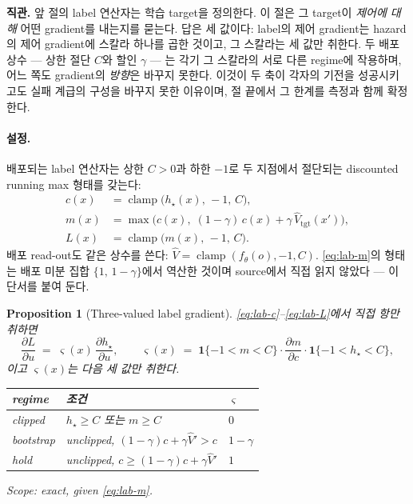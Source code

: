 \documentclass[11pt]{article}
\theoremstyle{plain}
\newtheorem{proposition}[theorem]{Proposition}
\theoremstyle{definition}
\theoremstyle{remark}
\newcommand{\Vhat}{\widehat V}
\begin{document}
\textbf{직관.} 앞 절의 label 연산자는 학습 target을 정의한다. 이 절은 그 target이 \emph{제어에
대해} 어떤 gradient를 내는지를 묻는다. 답은 세 값이다: label의 제어 gradient는 hazard의
제어 gradient에 스칼라 하나를 곱한 것이고, 그 스칼라는 세 값만 취한다. 두 배포 상수 --- 상한
절단 $C$와 할인 $\gamma$ --- 는 각기 그 스칼라의 서로 다른 regime에 작용하며, 어느 쪽도 gradient의
\emph{방향}은 바꾸지 못한다. 이것이 두 축이 각자의 기전을 성공시키고도 실패 계급의 구성을
바꾸지 못한 이유이며, 절 끝에서 그 한계를 측정과 함께 확정한다.

\paragraph{설정.}
배포되는 label 연산자는 상한 $C>0$과 하한 $-1$로 두 지점에서 절단되는 discounted running max
형태를 갖는다:
\begin{align}
  c(x) &= \operatorname{clamp}\!\big(h_\star(x),\, -1,\, C\big), \label{eq:lab-c}\\
  m(x) &= \max\!\Big(c(x),\; (1-\gamma)\,c(x) + \gamma\,\Vhat_{\mathrm{tgt}}(x')\Big),
         \label{eq:lab-m}\\
  L(x) &= \operatorname{clamp}\!\big(m(x),\, -1,\, C\big). \label{eq:lab-L}
\end{align}
배포 read-out도 같은 상수를 쓴다: $\Vhat = \operatorname{clamp}(f_\theta(o),-1,C)$. \eqref{eq:lab-m}의
형태는 배포 미분 집합 $\{1,\,1-\gamma\}$에서 역산한 것이며 source에서 직접 읽지 않았다 --- 이
단서를 붙여 둔다.

\begin{proposition}[Three-valued label gradient]\label{prop:label-tri}
\eqref{eq:lab-c}--\eqref{eq:lab-L}에서 직접 항만 취하면
\begin{equation}
  \frac{\partial L}{\partial u} \;=\; \varsigma(x)\,\frac{\partial h_\star}{\partial u},
  \qquad
  \varsigma(x) \;=\; \mathbf{1}\{-1<m<C\}\cdot\frac{\partial m}{\partial c}\cdot
             \mathbf{1}\{-1<h_\star<C\},
  \label{eq:lab-s}
\end{equation}
이고 $\varsigma(x)$는 다음 세 값만 취한다.
\begin{center}
\begin{tabular}{lll}
\toprule
regime & 조건 & $\varsigma$ \\
\midrule
clipped   & $h_\star\ge C$ 또는 $m\ge C$ & $0$ \\
bootstrap & unclipped, $(1-\gamma)c+\gamma\Vhat' > c$ & $1-\gamma$ \\
hold      & unclipped, $c \ge (1-\gamma)c+\gamma\Vhat'$ & $1$ \\
\bottomrule
\end{tabular}
\end{center}
Scope: exact, given \eqref{eq:lab-m}.
\end{proposition}
\end{document}
